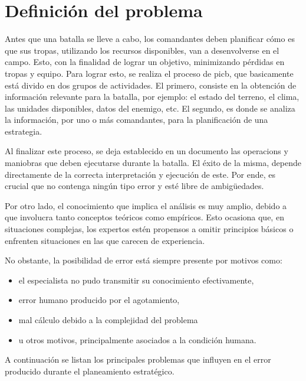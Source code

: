 \section{Definición del problema}

Antes que una batalla se lleve a cabo, los comandantes deben planificar cómo es que sus tropas, utilizando los recursos disponibles, van a desenvolverse en el campo. Esto, con la finalidad de lograr un objetivo, minimizando pérdidas en tropas y equipo. Para lograr esto, se realiza el proceso de \gls{picb}, que basicamente está divido en dos grupos de actividades. El primero, consiste en la obtención de información relevante para la batalla, por ejemplo: el estado del terreno, el clima, las unidades disponibles, datos del enemigo, etc. El segundo, es donde se analiza la información, por uno o más comandantes, para la planificación de una estrategia. 

Al finalizar este proceso, se deja establecido en un documento las \glspl{operacion} y \glspl{maniobra} que deben ejecutarse durante la batalla. El éxito de la misma, depende directamente de la correcta interpretación y ejecución de este. Por ende, es crucial que no contenga ningún tipo error y esté libre de ambigüedades. 

Por otro lado, el conocimiento que implica el análisis es muy amplio, debido a que involucra tanto conceptos teóricos como empíricos. Esto ocasiona que, en situaciones complejas, los expertos estén propensos a omitir principios básicos o
enfrenten situaciones en las que carecen de experiencia.


No obstante, la posibilidad de error está siempre presente por motivos como:
\begin{itemize}
\item el especialista no pudo transmitir su conocimiento efectivamente,
\item error humano producido por el agotamiento,
\item mal cálculo debido a la complejidad del problema
\item u otros motivos, principalmente asociados a la condición humana.
\end{itemize}

A continuación se listan los principales problemas que influyen en el error producido durante el planeamiento estratégico.


